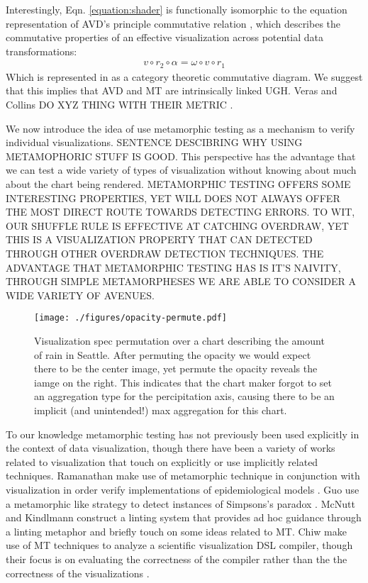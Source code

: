 Interestingly, Eqn. \ref{equation:shader} is functionally isomorphic to the equation representation of AVD's principle commutative relation \cite{kindlmann2014algebraic}, which describes the commutative properties of an effective visualization across potential data transformations:
    \begin{align}
        v \circ r_2  \circ \alpha = \omega \circ v \circ r_1
    \end{align}
Which is represented in  as a category theoretic commutative diagram. We suggest that this implies that AVD and MT are intrinsically linked UGH. Veras and Collins DO XYZ THING WITH THEIR METRIC \cite{veras2019discriminability}.

We now introduce the idea of use metamorphic testing as a mechanism to verify individual visualizations. SENTENCE DESCIBRING WHY USING METAMOPHORIC STUFF IS GOOD. This perspective has the advantage that we can test a wide variety of types of visualization without knowing about much about the chart being rendered.
%
METAMORPHIC TESTING OFFERS SOME INTERESTING PROPERTIES, YET WILL DOES NOT ALWAYS OFFER THE MOST DIRECT ROUTE TOWARDS DETECTING ERRORS. TO WIT, OUR SHUFFLE RULE IS EFFECTIVE AT CATCHING OVERDRAW, YET THIS IS A VISUALIZATION PROPERTY THAT CAN DETECTED THROUGH OTHER OVERDRAW DETECTION TECHNIQUES. THE ADVANTAGE THAT METAMORPHIC TESTING HAS IS IT'S NAIVITY, THROUGH SIMPLE METAMORPHESES WE ARE ABLE TO CONSIDER A WIDE VARIETY OF AVENUES.



\begin{figure}[bth]
   \centering
   \texttt{[image: ./figures/opacity-permute.pdf]}
   \caption{
    Visualization spec permutation over a chart describing the amount of rain in Seattle. After permuting the opacity we would expect there to be the center image, yet permute the opacity reveals the iamge on the right. This indicates that the chart maker forgot to set an aggregation type for the percipitation axis, causing there to be an implicit (and unintended!) max aggregation for this chart.
   }
   \label{fig:opacity-permute}
\end{figure}




To our knowledge metamorphic testing has not previously been used explicitly in the context of data visualization, though there have been a variety of works related to visualization that touch on explicitly or use implicitly related techniques.  Ramanathan \etal make use of metamorphic technique in conjunction with visualization in order verify implementations of epidemiological models \cite{ramanathan2012verification}. Guo \etal use a metamorphic like strategy to detect instances of Simpsons's paradox \cite{guo2017you}. McNutt and Kindlmann construct a linting system that provides ad hoc guidance through a linting metaphor \cite{mcnuttlinting} and briefly touch on some ideas related to MT. Chiw \etal make use of MT techniques to analyze a scientific visualization DSL compiler, though their focus is on evaluating the correctness of the compiler rather than the the correctness of the visualizations \cite{chiw2017datm}.



